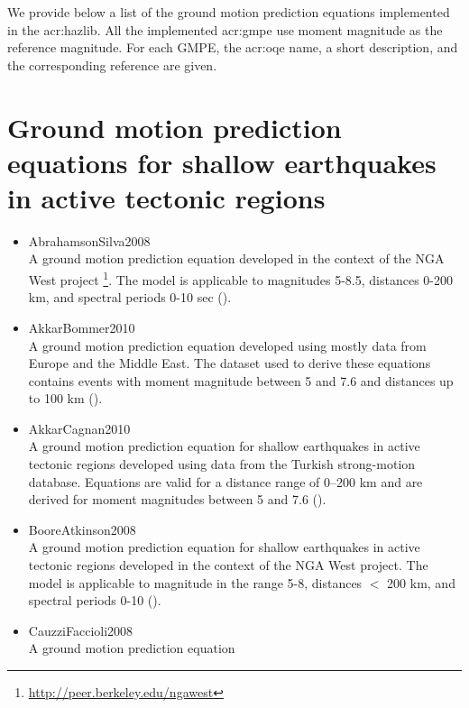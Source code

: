 \label{sec:gmpes_list}
We provide below a list of the ground motion prediction equations 
implemented in the \gls{acr:hazlib}. All the implemented \gls{acr:gmpe}
use moment magnitude as the reference magnitude. For each GMPE,
the \gls{acr:oqe} name, a short description, and the corresponding reference
are given.
%
\section[GMPEs for shallow earthquakes in active tectonic regions]{Ground motion prediction equations for shallow earthquakes in active tectonic regions}
\begin{itemize}
    \item AbrahamsonSilva2008 \hfill \\ A ground motion prediction equation 
        developed in the context of the NGA West project 
		\footnote{\href{http://peer.berkeley.edu/ngawest/}{http://peer.berkeley.edu/ngawest}}.
        The model is applicable to magnitudes 5-8.5, distances 0-200 km, and
        spectral periods 0-10 sec (\cite{abrahamson2008}).
    \item AkkarBommer2010 \hfill \\ A ground motion prediction equation 
        developed using mostly data from Europe and the Middle East. The 
		dataset 
        used to derive these equations contains events with moment 
        magnitude between 5 and 7.6 and distances up to 100 km 
		(\cite{akkar2010}).
    \item AkkarCagnan2010 \hfill \\ A ground motion prediction equation for 
		shallow
        earthquakes in active tectonic regions developed using data from the 
        Turkish strong-motion database. Equations are valid for a distance 
        range of 0–200 km and are derived for moment magnitudes 
        between 5 and 7.6 (\cite{akkar2010a}).
    \item BooreAtkinson2008 \hfill \\ A ground motion prediction equation 
        for shallow earthquakes in active tectonic regions developed in 
        the context of the NGA West project.
        The model is applicable to magnitude in the range 5-8, 
		distances $<$ 200 km,
        and spectral periods 0-10 (\cite{boore2008}).
    \item CauzziFaccioli2008 \hfill \\ A ground motion prediction equation 

\end{itemize}

